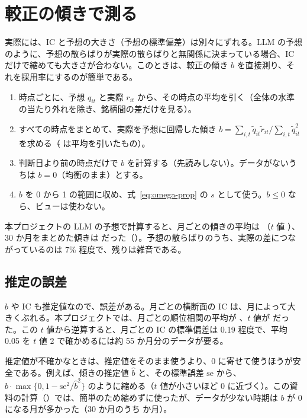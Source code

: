 \section{較正の傾きで測る}\label{sec:slope}

実際には、IC と予想の大きさ（予想の標準偏差）は別々にずれる。LLM の予想のように、予想の散らばりが実際の散らばりと無関係に決まっている場合、IC だけで縮めても大きさが合わない。このときは、較正の傾き $b$ を直接測り、それを採用率にするのが簡単である。

\begin{enumerate}
\item 時点ごとに、予想 $q_{it}$ と実際 $r_{it}$ から、その時点の平均を引く（全体の水準の当たり外れを除き、銘柄間の差だけを見る）。
\item すべての時点をまとめて、実際を予想に回帰した傾き $b=\sum_{i,t}\tilde q_{it}\tilde r_{it}\big/\sum_{i,t}\tilde q_{it}^2$ を求める（$\tilde{}$ は平均を引いたもの）。
\item 判断日より前の時点だけで $b$ を計算する（先読みしない）。データがないうちは $b=0$（均衡のまま）とする。
\item $b$ を 0 から 1 の範囲に収め、式~\eqref{eq:omega-prop} の $s$ として使う。$b\le0$ なら、ビューは使わない。
\end{enumerate}

本プロジェクトの LLM の予想で計算すると、月ごとの傾きの平均は （$t$ 値 ）、30 か月をまとめた傾きは  だった（）。予想の散らばりのうち、実際の差につながっているのは 7\% 程度で、残りは雑音である。

\subsection*{推定の誤差}

$b$ や IC も推定値なので、誤差がある。月ごとの横断面の IC は、月によって大きくぶれる。本プロジェクトでは、月ごとの順位相関の平均が 、$t$ 値が  だった。この $t$ 値から逆算すると、月ごとの IC の標準偏差は 0.19 程度で、平均 0.05 を $t$ 値 2 で確かめるには約 55 か月分のデータが要る。

推定値が不確かなときは、推定値をそのまま使うより、0 に寄せて使うほうが安全である。例えば、傾きの推定値 $\hat b$ と、その標準誤差 $\mathrm{se}$ から、$\hat b\cdot\max\{0,1-\mathrm{se}^2/\hat b^2\}$ のように縮める（$t$ 値が小さいほど 0 に近づく）。この資料の計算（）では、簡単のため縮めずに使ったが、データが少ない時期は $b$ が 0 になる月が多かった（30 か月のうち  か月）。

